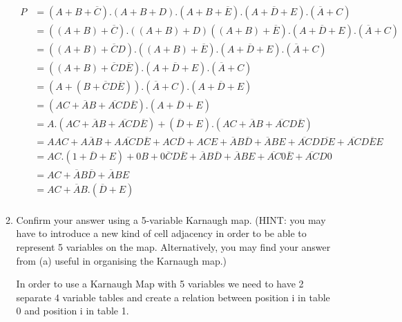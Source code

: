 \documentclass[10pt,\jkfside,a4paper]{article}
\begin{document}
\begin{enumerate}
\begin{enumerate}
\begin{equation*}
\begin{split}
P &= (A + B + \overline C).(A + B + D).(A + B + \overline E).(A + \overline D + E).(\overline A + C)\\
  &= ((A + B) + \overline C).((A + B) + D)((A + B) + \overline E).(A + \overline D + E).(\overline A + C)\\
  &= ((A + B) + \overline CD).((A + B) + \overline E).(A + \overline D + E).(\overline A + C)\\
  &= ((A + B) + \overline CD\overline E).(A + \overline D + E).(\overline A + C)\\
  &= (A + (B + \overline CD\overline E)).(\overline A + C).(A + \overline D + E)\\
  &= (AC + \overline AB+ \overline {AC}D\overline E).(A + \overline D + E)\\
  &= A.(AC + \overline AB + \overline {AC}D\overline E) + (\overline D + E).(AC + \overline AB + \overline {AC}D\overline E)\\
  &= AAC + A\overline AB + A\overline{AC}D\overline E + AC\overline D + ACE + \overline AB\overline D + \overline ABE + \overline{AC}D\overline{DE} + \overline{AC}D\overline EE\\
  &= AC.(1 + \overline D + E) + 0B + 0\overline CD\overline E + \overline AB\overline D + \overline ABE + \overline{AC}0\overline E + \overline{AC}D0\\
  &= AC + \overline AB\overline D + \overline ABE\\
  &= AC + \overline AB.(\overline D + E)\\
\end{split}
\end{equation*}
\item{Confirm your answer using a 5-variable Karnaugh map. (HINT: you may have to introduce a new kind of cell adjacency in order to be able to represent 5 variables on the map.
Alternatively, you may find your answer from (a) useful in organising the Karnaugh map.)}

In order to use a Karnaugh Map with 5 variables we need to have 2 separate 4 variable tables and create a relation between position i in table 0 and position i in table 1.


\end{enumerate}
\end{enumerate}
\end{document}
